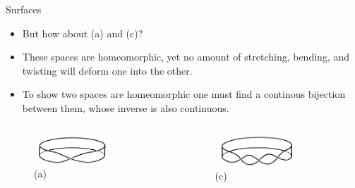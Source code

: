 \documentclass{beamer}
\begin{document}
\begin{frame}{Surfaces}
  \begin{block}{}
    \begin{itemize}
    \item But how about (a) and (c)?
    \item These spaces are homeomorphic, yet no amount of stretching, bending, and twisting will deform one into the other.
    \item To show two spaces are homeomorphic one must find a continous bijection between them, whose inverse is also continuous.
    \end{itemize}
  \end{block}
  \begin{columns}
    \begin{column}{0.5\textwidth}
      \begin{figure}
        \centering
        \includegraphics[width=0.7\textwidth]{figure_1_14_a.png}
        \caption{(a)}
      \end{figure}
    \end{column}
    \begin{column}{0.5\textwidth}
      \begin{figure}
        \centering
        \includegraphics[width=0.7\textwidth]{figure_1_14_c.png}
        \caption{(c)}
      \end{figure}
    \end{column}
  \end{columns}
\end{frame}
\end{document}
